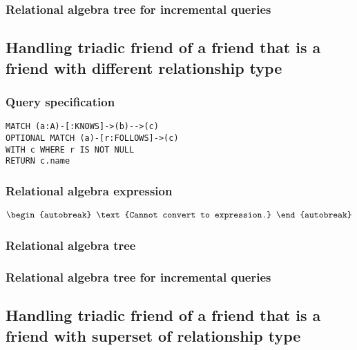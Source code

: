 \subsubsection*{Relational algebra tree for incremental queries}


\subsection{Handling triadic friend of a friend that is a friend with different relationship type}

\subsubsection*{Query specification}

\begin{lstlisting}
MATCH (a:A)-[:KNOWS]->(b)-->(c)
OPTIONAL MATCH (a)-[r:FOLLOWS]->(c)
WITH c WHERE r IS NOT NULL
RETURN c.name
\end{lstlisting}

\subsubsection*{Relational algebra expression}

\begin{align*}
\begin{autobreak}
\text{Cannot convert to expression.}
\end{autobreak}
\end{align*}

\subsubsection*{Relational algebra tree}


\subsubsection*{Relational algebra tree for incremental queries}


\subsection{Handling triadic friend of a friend that is a friend with superset of relationship type}

